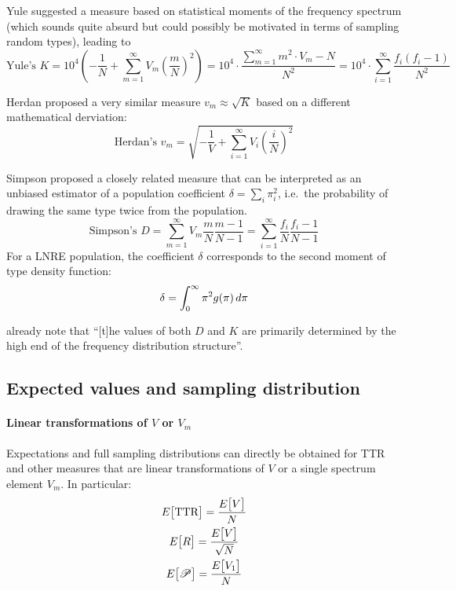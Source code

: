 \documentclass[a4paper]{article}
\begin{document}
Yule suggested a measure based on statistical moments of the frequency
spectrum (which sounds quite absurd but could possibly be motivated in
terms of sampling random types), leading to
\begin{equation}
  \label{eq:prod:yule-K}
  \text{Yule's } K = 
  10^4 \left(-\frac1N + \sum_{m=1}^{\infty} V_m \left( \frac{m}{N}\right)^2 \right)
  = 10^4 \cdot \frac{\sum_{m=1}^{\infty} m^2\cdot V_m - N}{N^2}
  = 10^4 \cdot \sum_{i=1}^{\infty} \frac{f_i (f_i - 1)}{N^2}
\end{equation}

Herdan proposed a very similar measure $v_m \approx \sqrt{K}$ based on a different
mathematical derviation:
\begin{equation}
  \label{eq:prod:herdan-vm}
  \text{Herdan's } v_m =
  \sqrt{-\frac{1}{V} + \sum_{i=1}^{\infty} V_i \left(\frac{i}{N}\right)^2}
\end{equation}

Simpson proposed a closely related measure that can be interpreted as an
unbiased estimator of a population coefficient
$\delta = \sum_i \pi_i^2$, i.e.\ the probability of drawing the same type
twice from the population.
\begin{equation}
  \label{eq:prod:simpson-D}
  \text{Simpson's } D = \sum_{m=1}^{\infty} V_m \frac{m}{N} \frac{m - 1}{N - 1}
  = \sum_{i=1}^{\infty} \frac{f_i}{N} \frac{f_i-1}{N-1}
\end{equation}
For a LNRE population, the coefficient $\delta$ corresponds to the second
moment of type density function:
\begin{equation}
  \label{eq:prod:tdf-2nd-moment}
  \delta = \int_0^{\infty} \pi^2 g(\pi) \,d\pi
\end{equation}

\citet[124]{Baayen:vanHalteren:Tweedie:96} already note that ``[t]he values of
both $D$ and $K$ are primarily determined by the high end of the frequency
distribution structure''.

\subsection{Expected values and sampling distribution}
\label{sec:prod:expectation}

\paragraph*{Linear transformations of $V$ or $V_m$}
Expectations and full sampling distributions can directly be obtained for TTR
and other measures that are linear transformations of $V$ or a single spectrum
element $V_m$.  In particular:
\begin{gather}
  E_{}\bigl[\text{TTR}\bigr] = \frac{E_{}\bigl[V\bigr]}{N}\\
  E_{}\bigl[R\bigr] = \frac{E_{}\bigl[V\bigr]}{\sqrt{N}}\\
  E_{}\bigl[\mathscr{P}\bigr] = \frac{E_{}\bigl[V_1\bigr]}{N}
\end{gather}
\end{document}
